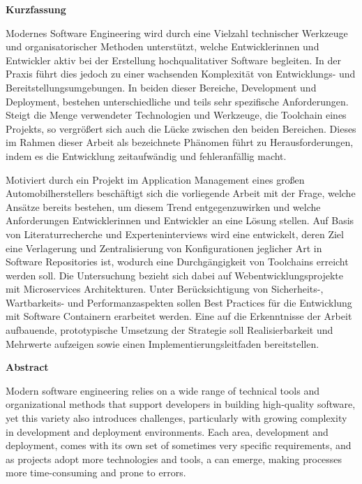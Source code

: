 \clearpage

\begin{center}
    {\LARGE\textbf{Kurzfassung}}
\end{center}
\vspace{1em}

Modernes Software Engineering wird durch eine Vielzahl technischer Werkzeuge und organisatorischer Methoden unterstützt, welche Entwicklerinnen und Entwickler aktiv bei der Erstellung hochqualitativer Software begleiten. In der Praxis führt dies jedoch zu einer wachsenden Komplexität von Entwicklungs- und Bereitstellungsumgebungen. In beiden dieser Bereiche, Development und Deployment, bestehen unterschiedliche und teils sehr spezifische Anforderungen. Steigt die Menge verwendeter Technologien und Werkzeuge, die Toolchain eines Projekts, so vergrößert sich auch die Lücke zwischen den beiden Bereichen. Dieses im Rahmen dieser Arbeit als  bezeichnete Phänomen führt zu Herausforderungen, indem es die Entwicklung zeitaufwändig und fehleranfällig macht.

Motiviert durch ein Projekt im Application Management eines großen Automobilherstellers beschäftigt sich die vorliegende Arbeit mit der Frage, welche Ansätze bereits bestehen, um diesem Trend entgegenzuwirken und welche Anforderungen Entwicklerinnen und Entwickler an eine Lösung stellen. Auf Basis von Literaturrecherche und Experteninterviews wird eine  entwickelt, deren Ziel eine Verlagerung und Zentralisierung von Konfigurationen jeglicher Art in Software Repositories ist, wodurch eine Durchgängigkeit von Toolchains erreicht werden soll. Die Untersuchung bezieht sich dabei auf Webentwicklungsprojekte mit Microservices Architekturen. Unter Berücksichtigung von Sicherheits-, Wartbarkeits- und Performanzaspekten sollen Best Practices für die Entwicklung mit Software Containern erarbeitet werden. Eine auf die Erkenntnisse der Arbeit aufbauende, prototypische Umsetzung der Strategie soll Realisierbarkeit und Mehrwerte aufzeigen sowie einen Implementierungsleitfaden bereitstellen.

\vfil

\begin{center}
    {\LARGE\textbf{Abstract}}
\end{center}
\vspace{1em}

Modern software engineering relies on a wide range of technical tools and organizational methods that support developers in building high-quality software, yet this variety also introduces challenges, particularly with growing complexity in development and deployment environments. Each area, development and deployment, comes with its own set of sometimes very specific requirements, and as projects adopt more technologies and tools, a  can emerge, making processes more time-consuming and prone to errors.

